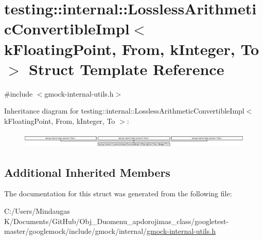 \hypertarget{structtesting_1_1internal_1_1_lossless_arithmetic_convertible_impl_3_01k_floating_point_00_01_from_00_01k_integer_00_01_to_01_4}{}\section{testing\+::internal\+::Lossless\+Arithmetic\+Convertible\+Impl$<$ k\+Floating\+Point, From, k\+Integer, To $>$ Struct Template Reference}
\label{structtesting_1_1internal_1_1_lossless_arithmetic_convertible_impl_3_01k_floating_point_00_01_from_00_01k_integer_00_01_to_01_4}


{\ttfamily \#include $<$gmock-\/internal-\/utils.\+h$>$}

Inheritance diagram for testing\+::internal\+::Lossless\+Arithmetic\+Convertible\+Impl$<$ k\+Floating\+Point, From, k\+Integer, To $>$\+:\begin{figure}[H]
\begin{center}
\leavevmode
\includegraphics[height=0.719332cm]{d6/df3/structtesting_1_1internal_1_1_lossless_arithmetic_convertible_impl_3_01k_floating_point_00_01_from_00_01k_integer_00_01_to_01_4}
\end{center}
\end{figure}
\subsection*{Additional Inherited Members}


The documentation for this struct was generated from the following file\+:\begin{DoxyCompactItemize}
\item 
C\+:/\+Users/\+Mindaugas K/\+Documents/\+Git\+Hub/\+Obj\+\_\+\+Duomenu\+\_\+apdorojimas\+\_\+class/googletest-\/master/googlemock/include/gmock/internal/\mbox{\hyperlink{googletest-master_2googlemock_2include_2gmock_2internal_2gmock-internal-utils_8h}{gmock-\/internal-\/utils.\+h}}\end{DoxyCompactItemize}
